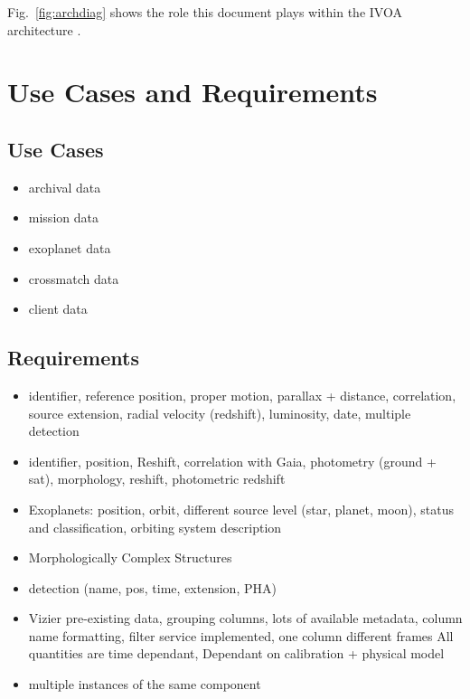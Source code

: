 \documentclass[11pt,a4paper]{ivoa}
\begin{document}
Fig.~\ref{fig:archdiag} shows the role this document plays within the
IVOA architecture \citep{note:VOARCH}.



\section{Use Cases and  Requirements}

\subsection{Use Cases}
\begin{itemize}
    \item archival data    
    \item mission data    
    \item exoplanet data    
    \item crossmatch data   
    \item client data
\end{itemize}



\subsection{Requirements}
\begin{itemize}
    \item identifier, reference position, proper motion, parallax + distance, correlation, source extension, radial velocity (redshift), luminosity, date, multiple detection
   \item identifier, position, Reshift, correlation with Gaia, photometry (ground + sat), morphology, reshift, photometric redshift
   \item Exoplanets: position, orbit, different source level (star, planet, moon), status and classification, orbiting system description
  \item Morphologically Complex Structures
  \item detection (name, pos, time, extension, PHA)
  \item Vizier pre-existing data, grouping columns, lots of available metadata, column name formatting, filter service implemented, one column different frames
All quantities are time dependant, Dependant on calibration + physical model
  \item multiple instances of the same component
\end{itemize}
\end{document}
